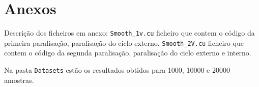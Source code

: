 \documentclass[11pt]{article}
\numberwithin{equation}{section}
\begin{document}
\section{Anexos}
Descrição dos ficheiros em anexo:
\texttt{Smooth\_1v.cu} ficheiro que contem o código da primeira paralisação, paralisação do ciclo externo.
\texttt{Smooth\_2V.cu} ficheiro que contem o código da segunda paralisação, paralisação do ciclo externo e interno.

Na pasta \texttt{Datasets} estão os resultados  obtidos para 1000, 10000 e 20000 amostras.
\end{document}
